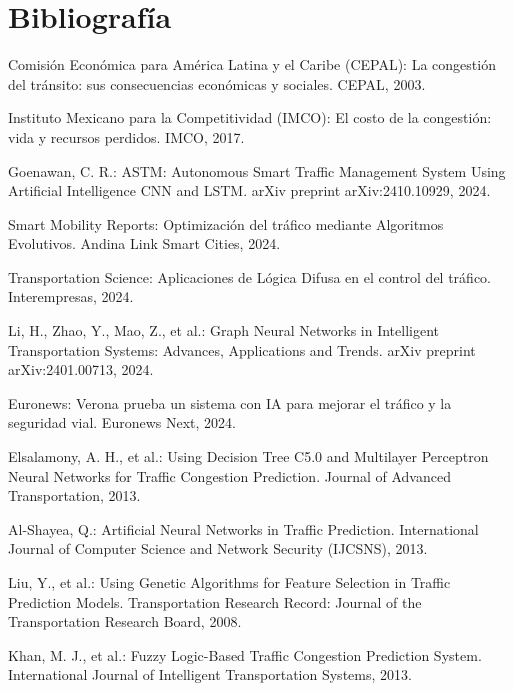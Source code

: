 \documentclass{svproc} %
\begin{document}
\section{Bibliografía}
\begin{thebibliography}{99}

     Comisión Económica para América Latina y el Caribe (CEPAL): La congestión del tránsito: sus consecuencias económicas y sociales. CEPAL, 2003.

     Instituto Mexicano para la Competitividad (IMCO): El costo de la congestión: vida y recursos perdidos. IMCO, 2017.

     Goenawan, C. R.: ASTM: Autonomous Smart Traffic Management System Using Artificial Intelligence CNN and LSTM. arXiv preprint arXiv:2410.10929, 2024.
    
     Smart Mobility Reports: Optimización del tráfico mediante Algoritmos Evolutivos. Andina Link Smart Cities, 2024.
    
     Transportation Science: Aplicaciones de Lógica Difusa en el control del tráfico. Interempresas, 2024.
  
     Li, H., Zhao, Y., Mao, Z., et al.: Graph Neural Networks in Intelligent Transportation Systems: Advances, Applications and Trends. arXiv preprint arXiv:2401.00713, 2024.

     Euronews: Verona prueba un sistema con IA para mejorar el tráfico y la seguridad vial. Euronews Next, 2024.
  
     Elsalamony, A. H., et al.: Using Decision Tree C5.0 and Multilayer Perceptron Neural Networks for Traffic Congestion Prediction. Journal of Advanced Transportation, 2013.
    
     Al-Shayea, Q.: Artificial Neural Networks in Traffic Prediction. International Journal of Computer Science and Network Security (IJCSNS), 2013.
    
     Liu, Y., et al.: Using Genetic Algorithms for Feature Selection in Traffic Prediction Models. Transportation Research Record: Journal of the Transportation Research Board, 2008.
    
     Khan, M. J., et al.: Fuzzy Logic-Based Traffic Congestion Prediction System. International Journal of Intelligent Transportation Systems, 2013.
  
  \end{thebibliography}
\end{document}
